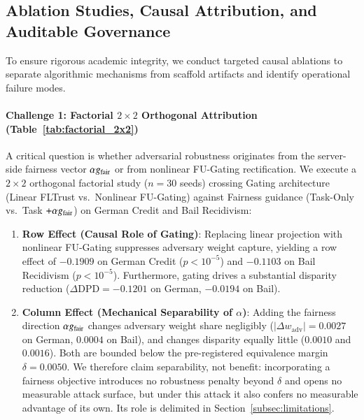 \subsection{Ablation Studies, Causal Attribution, and Auditable Governance}
\label{subsec:attribution}

To ensure rigorous academic integrity, we conduct targeted causal ablations to separate algorithmic mechanisms from scaffold artifacts and identify operational failure modes.




\paragraph{Challenge 1: Factorial $2 \times 2$ Orthogonal Attribution (Table~\ref{tab:factorial_2x2})}
A critical question is whether adversarial robustness originates from the server-side fairness vector $\alpha g_{\mathrm{fair}}$ or from nonlinear FU-Gating rectification. We execute a $2 \times 2$ orthogonal factorial study ($n=30$ seeds) crossing Gating architecture (Linear FLTrust vs.\ Nonlinear FU-Gating) against Fairness guidance (Task-Only vs.\ Task $+ \alpha g_{\mathrm{fair}}$) on German Credit and Bail Recidivism:
\begin{enumerate}[leftmargin=*]
    \item \textbf{Row Effect (Causal Role of Gating)}: Replacing linear projection with nonlinear FU-Gating suppresses adversary weight capture, yielding a row effect of $-0.1909$ on German Credit ($p < 10^{-5}$) and $-0.1103$ on Bail Recidivism ($p < 10^{-5}$). Furthermore, gating drives a substantial disparity reduction ($\Delta \text{DPD} = -0.1201$ on German, $-0.0194$ on Bail).
    \item \textbf{Column Effect (Mechanical Separability of $\alpha$)}: Adding the fairness direction $\alpha g_{\mathrm{fair}}$ changes adversary weight share negligibly ($|\Delta w_{\mathrm{adv}}| = 0.0027$ on German, $0.0004$ on Bail), and changes disparity equally little ($0.0010$ and $0.0016$). Both are bounded below the pre-registered equivalence margin $\delta = 0.0050$. We therefore claim separability, not benefit: incorporating a fairness objective introduces no robustness penalty beyond $\delta$ and opens no measurable attack surface, but under this attack it also confers no measurable advantage of its own. Its role is delimited in Section~\ref{subsec:limitations}.
\end{enumerate}

